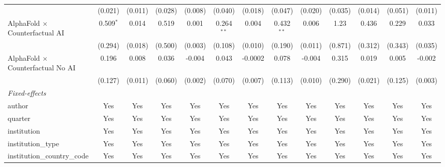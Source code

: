 \begin{tabular}{lcccccccccccc}
                                            & (0.021)       & (0.011)       & (0.028)       & (0.008)     & (0.040)      & (0.018)       & (0.047)      & (0.020)       & (0.035) & (0.014) & (0.051)      & (0.011)\\   
   AlphaFold $\times$ Counterfactual AI     & 0.509$^{*}$   & 0.014         & 0.519         & 0.001       & 0.264$^{**}$ & 0.004         & 0.432$^{**}$ & 0.006         & 1.23    & 0.436   & 0.229        & 0.033\\   
                                            & (0.294)       & (0.018)       & (0.500)       & (0.003)     & (0.108)      & (0.010)       & (0.190)      & (0.011)       & (0.871) & (0.312) & (0.343)      & (0.035)\\   
   AlphaFold $\times$ Counterfactual No AI  & 0.196         & 0.008         & 0.036         & -0.004      & 0.043        & -0.0002       & 0.078        & -0.004        & 0.315   & 0.019   & 0.005        & -0.002\\   
                                            & (0.127)       & (0.011)       & (0.060)       & (0.002)     & (0.070)      & (0.007)       & (0.113)      & (0.010)       & (0.290) & (0.021) & (0.125)      & (0.003)\\   
   \midrule
   \emph{Fixed-effects}\\
   author                                   & Yes           & Yes           & Yes           & Yes         & Yes          & Yes           & Yes          & Yes           & Yes     & Yes     & Yes          & Yes\\  
   quarter                                  & Yes           & Yes           & Yes           & Yes         & Yes          & Yes           & Yes          & Yes           & Yes     & Yes     & Yes          & Yes\\  
   institution                              & Yes           & Yes           & Yes           & Yes         & Yes          & Yes           & Yes          & Yes           & Yes     & Yes     & Yes          & Yes\\  
   institution\_type                        & Yes           & Yes           & Yes           & Yes         & Yes          & Yes           & Yes          & Yes           & Yes     & Yes     & Yes          & Yes\\  
   institution\_country\_code               & Yes           & Yes           & Yes           & Yes         & Yes          & Yes           & Yes          & Yes           & Yes     & Yes     & Yes          & Yes\\  

\end{tabular}

